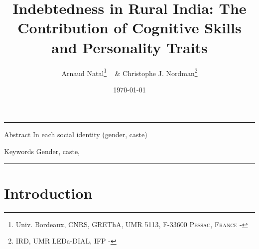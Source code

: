 \documentclass[a4paper, 11pt, onecolumn]{article}
\title{Indebtedness in Rural India: The Contribution of Cognitive Skills and Personality Traits}
\author{Arnaud Natal\thanks{Univ. Bordeaux, CNRS, GREThA, UMR 5113, F-33600 \textsc{Pessac, France} - \email{arnaud.natal@u-bordeaux.fr}} ~ \& Christophe J. Nordman\thanks{IRD, UMR LEDa-DIAL, IFP - \email{nordman@dial.prd}} }
\date{\today}
\begin{document}
\maketitle

\hrule 
\vspace{0.3cm}

\begin{resab}{Abstract}
In each social identity (gender, caste)
\end{resab}

\begin{motkey}{Keywords}
Gender, caste, 
\end{motkey}


\hrule

\section{Introduction}
\label{Introduction}

\end{document}
